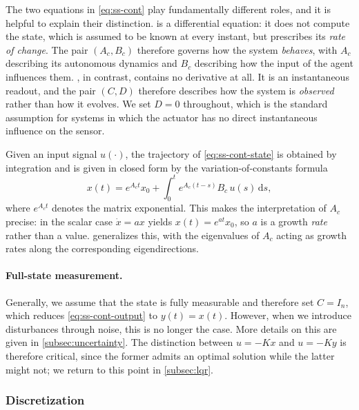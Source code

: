 The two equations in \eqref{eq:ss-cont} play fundamentally different roles, and
it is helpful to explain their distinction.
 is a differential equation: it does not compute the
state, which is assumed to be known at every instant, but prescribes its
\emph{rate of change}. The pair $(A_c, B_c)$ therefore governs how the system
\emph{behaves}, with $A_c$ describing its autonomous dynamics and
$B_c$ describing how the input of the agent influences them. , in contrast, 
contains no derivative at all. It is an instantaneous readout, and the pair $(C, D)$ therefore
describes how the system is \emph{observed} rather than how it evolves. We set
$D = 0$ throughout, which is the standard assumption for systems in which the
actuator has no direct instantaneous influence on the sensor.
 
Given an input signal $u(\cdot)$, the trajectory of \eqref{eq:ss-cont-state} is
obtained by integration and is given in closed form by the variation-of-constants
formula
\begin{equation}
    \label{eq:variation-of-constants}
    x(t) = e^{A_c t} x_0 + \int_{0}^{t} e^{A_c (t - s)} B_c\, u(s)\, \mathrm{d}s ,
\end{equation}
where $e^{A_c t}$ denotes the matrix exponential. This
makes the interpretation of $A_c$ precise: in the scalar case
$\dot{x} = a x$ yields $x(t) = e^{at} x_0$, so $a$ is a growth \emph{rate}
rather than a value.  generalizes this, with the
eigenvalues of $A_c$ acting as growth rates along the corresponding
eigendirections.
 
\paragraph{Full-state measurement.}
Generally, we assume that the state is fully
measurable and therefore set $C = I_n$, which reduces
\eqref{eq:ss-cont-output} to $y(t) = x(t)$. However, when we introduce disturbances
through noise, this is no longer the case. More details on this are
given in \cref{subsec:uncertainty}. The distinction between $u = -Kx$ and $u = -Ky$ is
therefore critical, since the former admits an optimal solution while the
latter might not; we return to this point in \cref{subsec:lqr}.
 
\subsubsection{Discretization}
\label{subsubsec:discretization}
 
